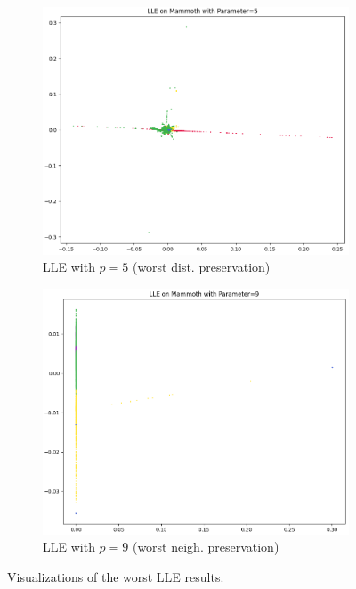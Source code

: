\begin{figure}[!]
     \centering
     \begin{subfigure}[t]{0.49\columnwidth}
    	\centering
    	\includegraphics[width=\columnwidth]{images/mammoth_lle5_plot.png}
    	\caption{LLE with $p=5$ (worst dist. preservation)}
        \label{fig:mammoth_lle5_plot}
    \end{subfigure}
     \hfill
     \begin{subfigure}[t]{0.49\columnwidth}
    	\centering
    	\includegraphics[width=\columnwidth]{images/mammoth_lle9_plot.png}
    	\caption{LLE with $p=9$ (worst neigh. preservation)}
        \label{fig:mammoth_lle9_plot}
    \end{subfigure}
     \caption[Visualization of Worst LLE Results]{Visualizations of the worst LLE results.}
    \label{fig:lle_worst_vis}
\end{figure}

